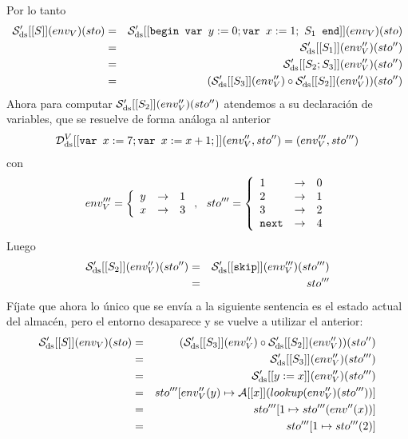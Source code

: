 \begin{example}
\[\]
Por lo tanto
\begin{eqnarray*}
    \mathcal{S}'_{\mathrm{ds}} [[S]](env_V)(sto) &=& \mathcal{S}'_{\mathrm{ds}} [[\texttt{begin } \texttt{var } y:=0; \texttt{var } x:=1;\ S_1 \texttt{ end}]](env_V)(sto) \\
    &=& \mathcal{S}'_{\mathrm{ds}}[[S_1]](env_V'')(sto'') \\
    &=& \mathcal{S}'_{\mathrm{ds}}[[S_2; S_3]](env_V'')(sto'') \\
    &=& (\mathcal{S}'_{\mathrm{ds}}[[S_3]](env_V'') \circ \mathcal{S}'_{\mathrm{ds}}[[S_2]](env_V'')) (sto'')
\end{eqnarray*}
Ahora para computar $\mathcal{S}'_{\mathrm{ds}}[[S_2]](env_V'') (sto'')$ atendemos a su declaración de variables, que se resuelve de forma análoga al anterior
\begin{eqnarray*}
    \mathcal{D}_{\mathrm{ds}}^V [[\texttt{var } x:=7; \texttt{var } x:=x+1;]](env_V'', sto'') = (env_V''', sto''')
\end{eqnarray*}
con
\[
    env_V''' = \left\{\begin{array}{lcl}
         y & \to & 1 \\
         x & \to & 3
    \end{array}\right.,\ \ sto''' = \left\{\begin{array}{lcl}
         1 & \to & 0 \\
         2 & \to & 1 \\
         3 & \to & 2 \\
         \texttt{next} & \to & 4
    \end{array}\right.
\]
Luego
\begin{eqnarray*}
    \mathcal{S}'_{\mathrm{ds}}[[S_2]](env_V'') (sto'') &=& \mathcal{S}'_{\mathrm{ds}}[[\texttt{skip}]](env_V''') (sto''') \\
    &=& sto'''
\end{eqnarray*}
Fíjate que ahora lo único que se envía a la siguiente sentencia es el estado actual del almacén, pero el entorno desaparece y se vuelve a utilizar el anterior:
\begin{eqnarray*}
    \mc{S}'_\nn{ds} [[S]](env_V)(sto)
    &=& (\mc{S}'_\nn{ds}[[S_3]](env_V'') \circ \mc{S}'_\nn{ds}[[S_2]](env_V'')) (sto'') \\
    &=& \mc{S}'_\nn{ds}[[S_3]](env_V'')(sto''') \\
    &=& \mc{S}'_\nn{ds}[[y:=x]](env_V'')(sto''') \\
    &=& sto'''[env_V''(y) \mapsto \mathcal{A}[[x]](lookup(env_V'')(sto'''))]\\
    &=& sto'''[1 \mapsto sto'''(env''(x))] \\
    &=& sto'''[1 \mapsto sto'''(2)] \\

\end{eqnarray*}
\end{example}
